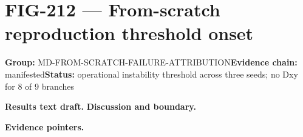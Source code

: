 \clearpage
\section{FIG-212 --- From-scratch reproduction threshold onset}
\label{figpage:fig-212}
\textbf{Group:} MD-FROM-SCRATCH-FAILURE-ATTRIBUTION\quad \textbf{Evidence chain:} manifested\quad \textbf{Status:} operational instability threshold across three seeds; no Dxy for 8 of 9 branches

\textbf{Results text draft.} 
\textbf{Discussion and boundary.} 


\textbf{Evidence pointers.}



\vfill
